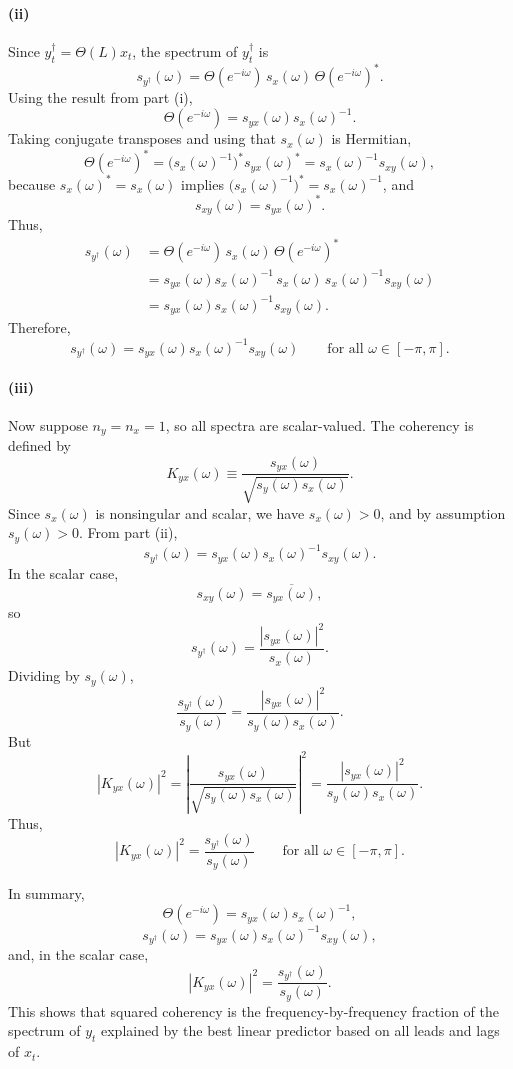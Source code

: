 \documentclass[11pt]{article}
\begin{document}
\paragraph{(ii)}
Since \(y_t^\dagger=\Theta(L)x_t\), the spectrum of \(y_t^\dagger\) is
\[
s_{y^\dagger}(\omega)
=
\Theta(e^{-i\omega})\,s_x(\omega)\,\Theta(e^{-i\omega})^*.
\]
Using the result from part (i),
\[
\Theta(e^{-i\omega})=s_{yx}(\omega)s_x(\omega)^{-1}.
\]
Taking conjugate transposes and using that \(s_x(\omega)\) is Hermitian,
\[
\Theta(e^{-i\omega})^*
=\bigl(s_x(\omega)^{-1}\bigr)^* s_{yx}(\omega)^*
=s_x(\omega)^{-1}s_{xy}(\omega),
\]
because \(s_x(\omega)^*=s_x(\omega)\) implies \(\bigl(s_x(\omega)^{-1}\bigr)^*=s_x(\omega)^{-1}\), and
\[
s_{xy}(\omega)=s_{yx}(\omega)^*.
\]
Thus,
\begin{align*}
s_{y^\dagger}(\omega)
&= \Theta(e^{-i\omega})\,s_x(\omega)\,\Theta(e^{-i\omega})^* \\
&= s_{yx}(\omega)s_x(\omega)^{-1}\,s_x(\omega)\,
s_x(\omega)^{-1} s_{xy}(\omega) \\
&= s_{yx}(\omega)s_x(\omega)^{-1}s_{xy}(\omega).
\end{align*}
Therefore,
\[
{
s_{y^\dagger}(\omega)=s_{yx}(\omega)s_x(\omega)^{-1}s_{xy}(\omega)
}
\qquad \text{for all } \omega\in[-\pi,\pi].
\]

\paragraph{(iii)}
Now suppose \(n_y=n_x=1\), so all spectra are scalar-valued. The coherency is defined by
\[
K_{yx}(\omega)\equiv \frac{s_{yx}(\omega)}{\sqrt{s_y(\omega)s_x(\omega)}}.
\]
Since \(s_x(\omega)\) is nonsingular and scalar, we have \(s_x(\omega)>0\), and by assumption \(s_y(\omega)>0\). From part (ii),
\[
s_{y^\dagger}(\omega)=s_{yx}(\omega)s_x(\omega)^{-1}s_{xy}(\omega).
\]
In the scalar case,
\[
s_{xy}(\omega)=\overline{s_{yx}(\omega)},
\]
so
\[
s_{y^\dagger}(\omega)=\frac{|s_{yx}(\omega)|^2}{s_x(\omega)}.
\]
Dividing by \(s_y(\omega)\),
\[
\frac{s_{y^\dagger}(\omega)}{s_y(\omega)}
=
\frac{|s_{yx}(\omega)|^2}{s_y(\omega)s_x(\omega)}.
\]
But
\[
|K_{yx}(\omega)|^2
=
\left|\frac{s_{yx}(\omega)}{\sqrt{s_y(\omega)s_x(\omega)}}\right|^2
=
\frac{|s_{yx}(\omega)|^2}{s_y(\omega)s_x(\omega)}.
\]
Thus,
\[
{
|K_{yx}(\omega)|^2=\frac{s_{y^\dagger}(\omega)}{s_y(\omega)}
}
\qquad \text{for all } \omega\in[-\pi,\pi].
\]

In summary,
\[
{\Theta(e^{-i\omega})=s_{yx}(\omega)s_x(\omega)^{-1}},
\]
\[
{s_{y^\dagger}(\omega)=s_{yx}(\omega)s_x(\omega)^{-1}s_{xy}(\omega)},
\]
and, in the scalar case,
\[
{|K_{yx}(\omega)|^2=\frac{s_{y^\dagger}(\omega)}{s_y(\omega)}}.
\]
This shows that squared coherency is the frequency-by-frequency fraction of the spectrum of \(y_t\) explained by the best linear predictor based on all leads and lags of \(x_t\).
\end{document}
